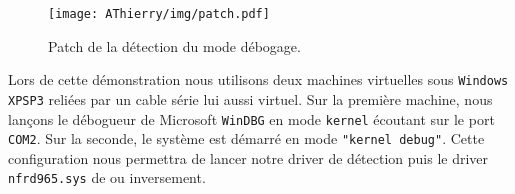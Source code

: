 
\begin{figure}
\begin{center}
\texttt{[image: AThierry/img/patch.pdf]}
\caption{Patch de la détection du mode débogage.}
\label{fig:AThierry_patch}
\end{center}
\end{figure}



Lors de cette démonstration nous utilisons deux machines virtuelles sous \texttt{Windows XPSP3} reliées par un cable série lui aussi virtuel. Sur la première machine, nous lançons le débogueur de Microsoft \texttt{WinDBG} en mode \texttt{kernel} écoutant sur le port \texttt{COM2}. Sur la seconde, le système est démarré en mode \texttt{"kernel debug"}. Cette configuration nous permettra de lancer notre driver de détection puis le driver \texttt{nfrd965.sys} de \Duqu\space ou inversement.
  
